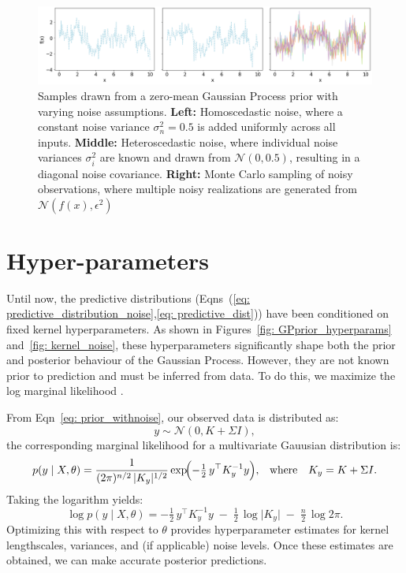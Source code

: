 \documentclass{ucdgradtaughtthesis}
\begin{document}
\begin{figure}[H]
    \centering
    \includegraphics[width=\textwidth]{LatexPlots/1dplots/GPR_noise_comparison.png}
    \caption[Comparing samples taken from a GP with Homoscedastic noise,Heterscedastic noise and monte carlo sampling of the noise.]{Samples drawn from a zero-mean Gaussian Process prior with varying noise assumptions.
    \textbf{Left:} Homoscedastic noise, where a constant noise variance \(\sigma_n^2 = 0.5\) is added uniformly across all inputs.
    \textbf{Middle:} Heteroscedastic noise, where individual noise variances \(\sigma_i^2\) are known and drawn from \(\mathcal{N}(0, 0.5)\), resulting in a diagonal noise covariance.
    \textbf{Right:} Monte Carlo sampling of noisy observations, where multiple noisy realizations are generated from \(\mathcal{N}(f(x), \epsilon^2)\)}
    \label{fig:noise_comparison}
\end{figure}




\section{Hyper-parameters}
\label{sec: Hyper_parameters}
Until now, the predictive distributions (Eqns~(\ref{eq: predictive_distribution_noise},\ref{eq: predictive_dist})) have been conditioned on fixed kernel hyperparameters. 
As shown in Figures~\ref{fig: GPprior_hyperparams} and~\ref{fig: kernel_noise}, 
these hyperparameters significantly shape both the prior and posterior behaviour of the Gaussian Process.
 However, they are not known prior to prediction and must be inferred from data. To do this, we maximize the log marginal likelihood \cite[Ch.~5]{bible}.

From Eqn~\ref{eq: prior_withnoise}, our observed data is distributed as: 
\[
y \sim \mathcal{N}(0, K + \Sigma I),
\]
the corresponding marginal likelihood for a multivariate Gauusian distribution is:
\[
p(y \mid X, \theta) = \frac{1}{(2\pi)^{n/2} \,\lvert K_y \rvert^{1/2}} 
\exp\!\Bigl(-\tfrac12\,y^\top K_y^{-1} y\Bigr), 
\quad\!\text{where}\quad K_y = K + \Sigma I.
\]
Taking the logarithm yields:
\begin{equation}\label{eq: 5}
\log p(y \mid X, \theta) 
= -\tfrac{1}{2}\,y^\top K_y^{-1}y \;-\; \tfrac{1}{2}\,\log\lvert K_y \rvert \;-\; \tfrac{n}{2}\,\log 2\pi.
\end{equation}
Optimizing this with respect to \(\theta\) provides hyperparameter estimates for kernel lengthscales, 
variances, and (if applicable) noise levels. Once these estimates are obtained, we can make accurate posterior predictions.
\end{document}
